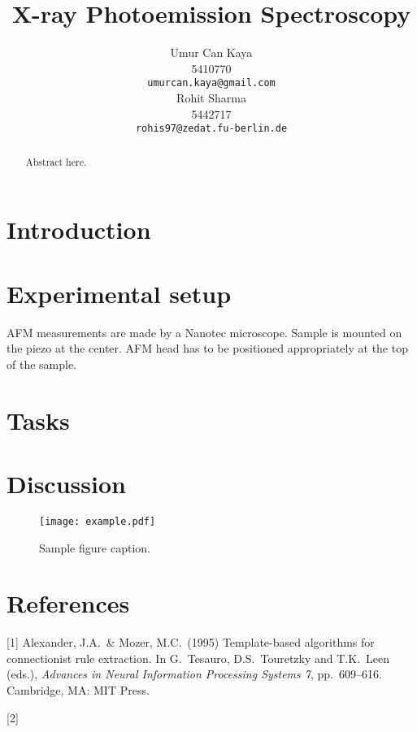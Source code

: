 \documentclass{article}
\title{X-ray Photoemission Spectroscopy}
\author{
Umur Can Kaya\\
5410770\\
\texttt{umurcan.kaya@gmail.com}\\
\And
Rohit Sharma\\
5442717\\
\texttt{rohis97@zedat.fu-berlin.de}\\
}
\begin{document}
\maketitle

\begin{abstract}
Abstract here.
\end{abstract}

\section{Introduction}


\section{Experimental setup}
AFM measurements are made by a Nanotec microscope. Sample is mounted on the piezo at the center. AFM head has to be positioned appropriately at the top of the sample.
\section{Tasks}
\section{Discussion}

\begin{figure}[h!]
\centering
\texttt{[image: example.pdf]}
\caption{Sample figure caption.}
\end{figure}


\section*{References}

[1] Alexander, J.A.\ \& Mozer, M.C.\ (1995) Template-based algorithms for
connectionist rule extraction. In G.\ Tesauro, D.S.\ Touretzky and T.K.\ Leen
(eds.), {\it Advances in Neural Information Processing Systems 7},
pp.\ 609--616. Cambridge, MA: MIT Press.

[2]
\end{document}

